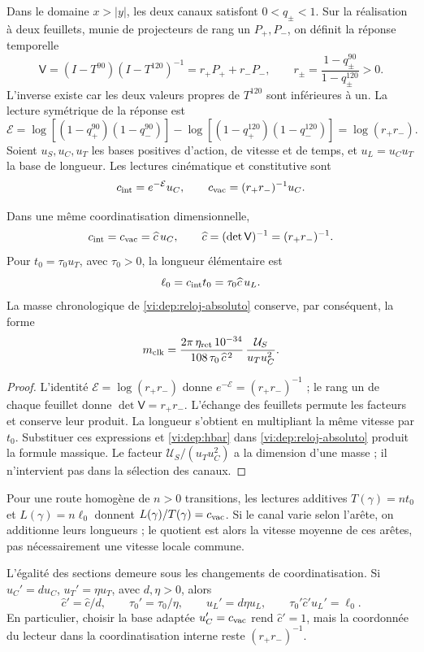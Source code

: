 Dans le domaine \(x>|y|\), les deux canaux satisfont \(0<q_\pm<1\).
Sur la réalisation à deux feuillets, munie de projecteurs de rang un
\(P_+,P_-\), on définit la réponse temporelle
\[
 \mathsf V=(I-T^{90})(I-T^{120})^{-1}
          =r_+P_++r_-P_-,
 \qquad r_\pm=\frac{1-q_\pm^{90}}{1-q_\pm^{120}}>0.
\]
L’inverse existe car les deux valeurs propres de \(T^{120}\) sont inférieures
à un. La lecture symétrique de la réponse est
\[
 \mathcal E=
 \log[(1-q_+^{90})(1-q_-^{90})]
 -\log[(1-q_+^{120})(1-q_-^{120})]
 =\log(r_+r_-).
\]
Soient \(u_S,u_C,u_T\) les bases positives d’action, de vitesse et de
temps, et \(u_L=u_Cu_T\) la base de longueur. Les lectures
cinématique et constitutive sont
\[
 c_{\rm int}=e^{-\mathcal E}u_C,\qquad
 c_{\rm vac}=(r_+r_-)^{-1}u_C.
\]

\begin{proposition}
\label{vi:dep:velocidad-comun}
Dans une même coordinatisation dimensionnelle,
\[
 c_{\rm int}=c_{\rm vac}=\widehat c\,u_C,
 \qquad \widehat c=(\det\mathsf V)^{-1}=(r_+r_-)^{-1}.
\]
Pour \(t_0=\tau_0u_T\), avec \(\tau_0>0\), la longueur élémentaire est
\[
 \ell_0=c_{\rm int}t_0=\tau_0\widehat c\,u_L.
\]
La masse chronologique de \eqref{vi:dep:reloj-absoluto} conserve, par
conséquent, la forme
\[
 m_{\rm clk}=
 \frac{2\pi\,\eta_{\rm ret}\,10^{-34}}
      {108\,\tau_0\,\widehat c^{\,2}}\,
 \frac{\mathcal U_S}{u_Tu_C^2}.
\]
\end{proposition}
\begin{proof}
L’identité \(\mathcal E=\log(r_+r_-)\) donne
\(e^{-\mathcal E}=(r_+r_-)^{-1}\) ; le rang un de chaque feuillet donne
\(\det\mathsf V=r_+r_-\). L’échange des feuillets permute les
facteurs et conserve leur produit. La longueur s’obtient en multipliant
la même vitesse par \(t_0\). Substituer ces expressions et
\eqref{vi:dep:hbar} dans \eqref{vi:dep:reloj-absoluto} produit la
formule massique. Le facteur \(\mathcal U_S/(u_Tu_C^2)\) a la
dimension d’une masse ; il n’intervient pas dans la sélection des canaux.
\end{proof}

Pour une route homogène de \(n>0\) transitions, les lectures additives
\(T(\gamma)=nt_0\) et \(L(\gamma)=n\ell_0\) donnent
\(L(\gamma)/T(\gamma)=c_{\rm vac}\). Si le canal varie selon
l’arête, on additionne leurs longueurs ; le quotient est alors la vitesse
moyenne de ces arêtes, pas nécessairement une vitesse locale commune.

L’égalité des sections demeure sous les changements de coordinatisation. Si
\(u_C'=du_C\), \(u_T'=\eta u_T\), avec \(d,\eta>0\), alors
\[
 \widehat c'=\widehat c/d,\qquad
 \tau_0'=\tau_0/\eta,\qquad u_L'=d\eta u_L,
 \qquad
 \tau_0'\widehat c'u_L'=\ell_0.
\]
En particulier, choisir la base adaptée \(u_C'=c_{\rm vac}\)
rend \(\widehat c'=1\), mais la coordonnée du lecteur dans la
coordinatisation interne reste \((r_+r_-)^{-1}\).

